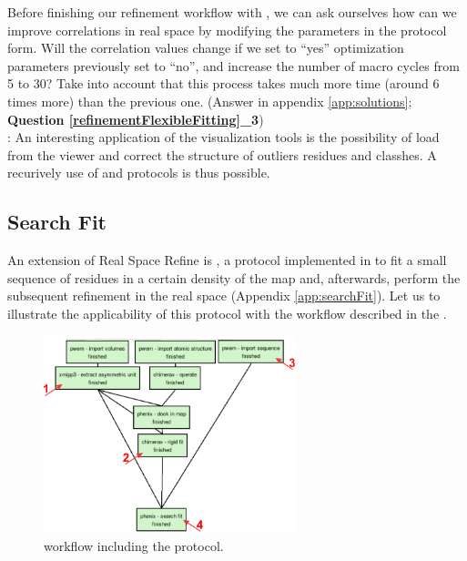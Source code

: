   Before finishing our refinement workflow with , we can ask ourselves how can we improve correlations in real space by modifying the  parameters in the protocol form. Will the correlation values change if we set to ``yes'' optimization parameters previously set to ``no'', and increase the number of macro cycles from 5 to 30? Take into account that this process takes much more time (around 6 times more) than the previous one. (Answer in appendix \ref{app:solutions}; \textbf{Question \ref{refinementFlexibleFitting}\_3})\\
  
  : An interesting application of the \phenix {} visualization tools is the possibility of load \coot from the \phenix viewer and correct the structure of outliers residues and classhes. A recurively use of \phenix {} and \coot protocols is thus possible.
  
  \subsection*{\phenix Search Fit}
  
  An extension of \phenix Real Space Refine is , a protocol implemented in \scipion to fit a small sequence of residues in a certain density of the map and, afterwards, perform the subsequent refinement in the real space (Appendix \ref{app:searchFit}). Let us to illustrate the applicability of this protocol with the workflow described in the .
  
   \begin{figure}[H]
  \centering 
  \captionsetup{width=.9\linewidth} 
  \includegraphics[width=0.65\textwidth]{Images/Fig_search_fit_1.pdf}
  \caption{\scipion workflow including the  protocol.}
  \label{fig:phenix_search_fit_1}
  \end{figure}
  
